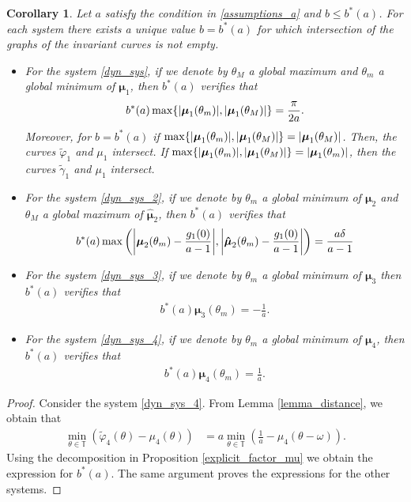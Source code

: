 \documentclass[12pt]{article}
\newcommand{\T}{\mathbb{T}}
\theoremstyle{plain}
\newtheorem{corollary}[defn]{Corollary}
\theoremstyle{remark}
\DeclarePairedDelimiter\abs{\lvert}{\rvert}
\theoremstyle{definition}
\begin{document}
\begin{corollary}
    Let $a$ satisfy the condition in \eqref{assumptions_a} and $b\leq b^*(a)$. For each system there exists a unique value $b=b^*(a)$ for which intersection of the graphs of the invariant curves is not empty. 
    \begin{itemize}
        \item For the system \eqref{dyn_sys}, if we denote by $\theta_M$ a global maximum and $\theta_m$ a global minimum of $\boldsymbol\mu_1$, then $b^*(a)$ verifies that
        \begin{align*}
            b^*(a)\max\{\abs{\boldsymbol\mu_1(\theta_m)},\abs{\boldsymbol\mu_1(\theta_M)}\} = \frac{\pi}{2a}.
        \end{align*}
        Moreover, for $b = b^*(a)$ if $\max\{\abs{\boldsymbol\mu_1(\theta_m)},\abs{\boldsymbol\mu_1(\theta_M)}\}=\abs{\boldsymbol\mu_1(\theta_M)}$. Then, the curves $\tilde\varphi_1$ and $\mu_1$ intersect. If $\max\{\abs{\boldsymbol\mu_1(\theta_m)},\abs{\boldsymbol\mu_1(\theta_M)}\}=\abs{\boldsymbol\mu_1(\theta_m)}$, then the curves $\tilde\gamma_1$ and $\mu_1$ intersect.
        \item For the system \eqref{dyn_sys_2}, if we denote by $\theta_m$ a global minimum of $\boldsymbol\mu_2$ and $\theta_M$ a global maximum of $\boldsymbol{\hat\mu}_2$, then $b^*(a)$ verifies that
        \begin{align*}
            b^*(a)\max\left(\abs*{\boldsymbol\mu_2(\theta_m) - \frac{g_1(0)}{a-1}}, \abs*{\boldsymbol{\hat\mu}_2(\theta_m) - \frac{g_1(0)}{a-1}} \right)= \frac{a\delta}{a-1}
        \end{align*}
        \item For the system \eqref{dyn_sys_3}, if we denote by $\theta_m$ a global minimum of $\boldsymbol\mu_3$ then $b^*(a)$ verifies that
        \begin{align*}
            b^*(a)\boldsymbol\mu_3(\theta_m) = -\frac{1}{a}.    
        \end{align*}
        \item For the system \eqref{dyn_sys_4}, if we denote by $\theta_m$ a global minimum of $\boldsymbol\mu_4$, then $b^*(a)$ verifies that
        \begin{align*}
            b^*(a)\boldsymbol\mu_4(\theta_m) = \frac{1}{a}.    
        \end{align*}
    \end{itemize}
\end{corollary}
\begin{proof}
    Consider the system \eqref{dyn_sys_4}. From Lemma \eqref{lemma_distance}, we obtain that
    \begin{align*}
            \min_{\theta\in\T}\left(\tilde\varphi_4(\theta)-\mu_4(\theta)\right)&=a\min_{\theta\in\T}\left(\frac{1}{a}-\mu_4(\theta-\omega)\right).
        \end{align*}
    Using the decomposition in Proposition \ref{explicit_factor_mu} we obtain the expression for $b^*(a)$. The same argument proves the expressions for the other systems.
\end{proof}
\end{document}
